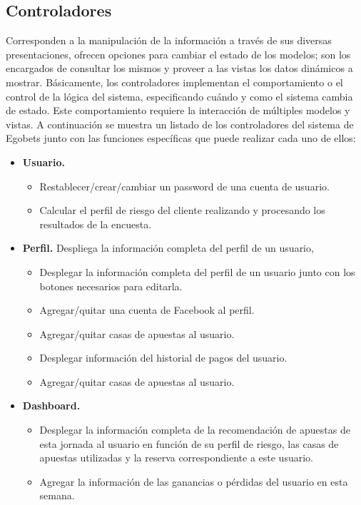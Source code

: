 		\subsection{Controladores}
		Corresponden a la manipulación de la información a través de sus diversas presentaciones, ofrecen opciones para cambiar el estado de los modelos; son los encargados de consultar los mismos y proveer a las vistas los datos dinámicos a mostrar. Básicamente, los controladores implementan el comportamiento o el control de la lógica del sistema, especificando cuándo y como el sistema cambia de estado. Este comportamiento requiere la interacción de múltiples modelos y vistas.
		A continuación se muestra un listado de los controladores del sistema de Egobets junto con las funciones específicas que puede realizar cada uno de ellos:
		\begin{itemize}
			\item \textbf{Usuario.}
			\begin{itemize}
				\item Restablecer/crear/cambiar un password de una cuenta de usuario.
				\item Calcular el perfil de riesgo del cliente realizando y procesando los resultados de la encuesta.
			\end{itemize}
			\item \textbf{Perfil.} Despliega la información completa del perfil de un usuario,
			\begin{itemize}
				\item Desplegar la información completa del perfil de un usuario junto con los botones necesarios para editarla.
				\item Agregar/quitar una cuenta de Facebook \cite{facebookDocuWeb} al perfil.
				\item Agregar/quitar casas de apuestas al usuario.
 				\item Desplegar información del historial de pagos del usuario.
				\item Agregar/quitar casas de apuestas al usuario.
			\end{itemize}
			\item \textbf{Dashboard.}
			\begin{itemize}
				\item Desplegar la información completa de la recomendación de apuestas de esta jornada al usuario en función de su perfil de riesgo, las casas de apuestas utilizadas y la reserva correspondiente a este usuario.
				\item Agregar la información de las ganancias o pérdidas del usuario en esta semana.

\end{itemize}
\end{itemize}

